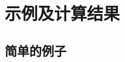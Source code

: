 \documentclass[UTF8]{article}
\begin{document}
%
%
%

%
%

\section{示例及计算结果}

\subsection{简单的例子}
\end{document}
